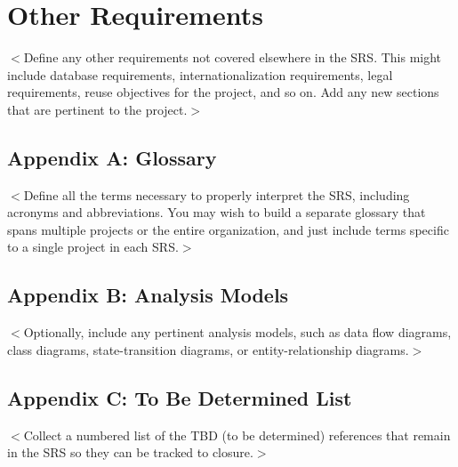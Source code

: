 \documentclass{scrreprt}
\begin{document}
\chapter{Other Requirements}
$<$Define any other requirements not covered elsewhere in the SRS. This might 
include database requirements, internationalization requirements, legal 
requirements, reuse objectives for the project, and so on. Add any new sections 
that are pertinent to the project.$>$


\section{Appendix A: Glossary}
$<$Define all the terms necessary to properly interpret the SRS, including 
acronyms and abbreviations. You may wish to build a separate glossary that spans 
multiple projects or the entire organization, and just include terms specific to 
a single project in each SRS.$>$

\section{Appendix B: Analysis Models}
$<$Optionally, include any pertinent analysis models, such as data flow 
diagrams, class diagrams, state-transition diagrams, or entity-relationship 
diagrams.$>$

\section{Appendix C: To Be Determined List}
$<$Collect a numbered list of the TBD (to be determined) references that remain 
in the SRS so they can be tracked to closure.$>$
\end{document}
